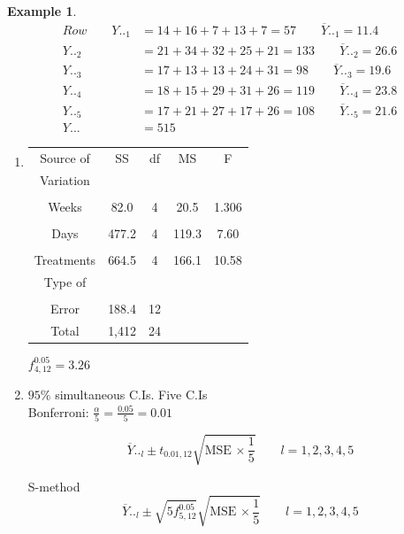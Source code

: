 \documentclass[11pt,a4paper]{article}
\theoremstyle{definition}
\newtheorem{exa}[thm]{Example}
\begin{document}
\begin{exa}
\begin{align*}
Row\qquad   Y.._1 & = 14 + 16 + 7 + 13 + 7 = 57\qquad  \overline{Y}.._1 = 11.4\\
                 Y.._2 & = 21 + 34 + 32 + 25 + 21 = 133\qquad  \overline{Y}.._2=26.6\\
                 Y.._3 & = 17 + 13 + 13 + 24 + 31 = 98\qquad  \overline{Y}.._3 = 19.6\\
                 Y.._4 & = 18 + 15 + 29 + 31 + 26 = 119\qquad  \overline{Y}.._4=23.8\\
                 Y.._5 & = 17 + 21 + 27 + 17 + 26 = 108\qquad  \overline{Y}.._5=21.6\\
                 Y... & = 515
\end{align*}


\begin{enumerate}
\item\quad 

\begin{table}[H]
\centering
\begin{tabular}{|c|cccc|}
\hline
Source of & SS & df & MS & F\\
Variation &&&&\\
\hline
&&&&\\
Weeks & 82.0 & 4 & 20.5 & 1.306\\
&&&&\\
Days & 477.2 & 4 & 119.3 & 7.60\\
&&&&\\
Treatments & 664.5 & 4 & 166.1 & 10.58\\
Type of &&&&\\
&&&&\\
Error & 188.4 & 12 &&\\
\hline
Total & 1,412 & 24 &&\\
\hline
\end{tabular}
\qquad  $f_{4,12}^{0.05}=3.26$\\
\end{table}


\item $95\%$ simultaneous C.Is. Five C.Is\\

Bonferroni: $\frac{\alpha}{5}=\frac{0.05}{5}=0.01$

$$\overline{Y}.._l \pm t_{0.01,12}\sqrt{\text{MSE}\,\times \frac{1}{5}}\qquad  l=1,2,3,4,5$$

S-method 
$$\overline{Y}.._l\pm \sqrt{5f^{0.05}_{5,12}}\sqrt{\text{MSE}\,\times \frac{1}{5}}\qquad  l=1,2,3,4,5$$


\end{enumerate}
\end{exa}
\end{document}
